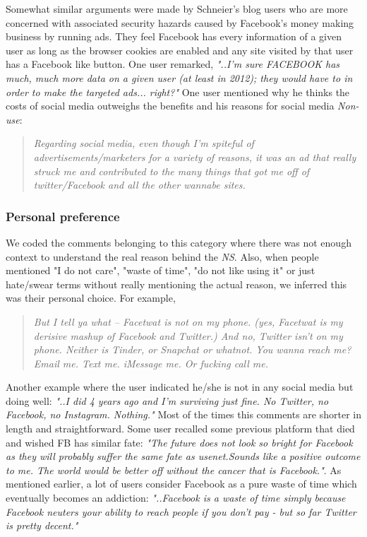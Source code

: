     Somewhat similar arguments were made by Schneier's blog users who are more concerned with associated security hazards caused by Facebook's money making business by running ads. They feel Facebook has every information of a given user as long as the browser cookies are enabled and any site visited by that user has a Facebook like button. One user remarked, \textit{"..I'm sure FACEBOOK has much, much more data on a given user (at least in 2012); they would have to in order to make the targeted ads... right?"} One user mentioned why he thinks the costs of social media outweighs the benefits and his reasons for social media \emph{Non-use}:
    \begin{quote}
         \textit{Regarding social media, even though I'm spiteful of advertisements/marketers for a variety of reasons, it was an ad that really struck me and contributed to the many things that got me off of twitter/Facebook and all the other wannabe sites.}
    \end{quote}
    
 \subsubsection{Personal preference}
 We coded the comments belonging to this category where there was not enough context to understand the real reason behind the \emph{NS}. Also, when people mentioned "I do not care", "waste of time", "do not like using it" or just hate/swear terms without really mentioning the actual reason, we inferred this was their personal choice. For example, 
     \begin{quote}
         \textit{But I tell ya what -- Facetwat is not on my phone. (yes, Facetwat is my derisive mashup of Facebook and Twitter.) And no, Twitter isn't on my phone. Neither is Tinder, or Snapchat or whatnot. You wanna reach me? Email me. Text me. iMessage me. Or fucking call me.}
     \end{quote}
     
     Another example where the user indicated he/she is not in any social media but doing well: \textit{"..I did 4 years ago and I'm surviving just fine. No Twitter, no Facebook, no Instagram. Nothing."} Most of the times this comments are shorter in length and straightforward. Some user recalled some previous platform that died and wished FB has similar fate: \textit{"The future does not look so bright for Facebook as they will probably suffer the same fate as usenet.Sounds like a positive outcome to me. The world would be better off without the cancer that is Facebook."}. As mentioned earlier, a lot of users consider Facebook as a pure waste of time which eventually becomes an addiction: \textit{"..Facebook is a waste of time simply because Facebook neuters your ability to reach people if you don't pay - but so far Twitter is pretty decent."}
     
